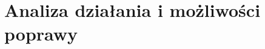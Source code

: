 \documentclass[twoside]{iisthesis}
\begin{document}
\chapter{Analiza działania i możliwości poprawy}
























\end{document}
